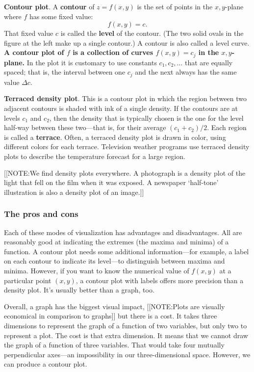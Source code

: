 {\bf Contour plot}. A {\bf contour}
of $z = f(x, y)$ is the set of points in the $x, y$-plane where $f$
has some fixed value:
\[
f(x, y) = c.
\]
That fixed value $c$ is called the {\bf level} of the
contour.  (The two solid ovals in the figure at the left make up a
single contour.)  A contour is also called a level curve.  {\bf A
  contour plot of $f$ is a collection of curves $f(x, y) = c_j$ in the
  $x, y$-plane.}  In the plot it is customary to use constants $c_1,
c_2, \ldots$ that are equally spaced; that is, the interval between
one $c_j$ and the next always has the same value $\Delta c$.


\enlargethispage*{40pt} {\bf Terraced density
  plot}.
This is a contour plot in which the region between two adjacent
contours is shaded with ink of a single density.  If the contours are
at levels $c_1$ and $c_2$, then the density that is typically chosen
is the one for the level half-way between these two---that is, for
their average $(c_1 + c_2)/2$.  Each region is called a {\bf
  terrace}. Often, a terraced density plot is drawn in
color, using different colors for each terrace.  Television weather
programs use terraced density plots to describe the temperature
forecast for a large region.

[[NOTE:We find density plots everywhere.  A photograph is a density
  plot of the light that fell on the film when it was exposed.  A
  newspaper `half-tone' illustration is also a density plot of an
  image.]]

\subsubsection{The pros and cons}
\label{subsubsec:the-pros-and-cons}

Each of these modes of visualization has advantages and disadvantages.
All are reasonably good at indicating the extremes (the maxima and
minima) of a function.  A contour plot needs some additional
information---for example, a label on each contour to indicate its
level---to distinguish between maxima and minima.  However, if you
want to know the numerical value of $f(x, y)$ at a particular point
$(x, y)$, a contour plot with labels offers more precision than a
density plot.  It's usually better than a graph, too.

Overall, a graph has the biggest visual impact, 
[[NOTE:Plots are visually economical in comparison to graphs]]	
but there is a cost.  It takes three dimensions to represent the graph
of a function of two variables, but only two to represent a plot.  The
cost is that extra dimension.  It means that we cannot draw the graph
of a function of three variables.  That would take four mutually
perpendicular axes---an impossibility in our three-dimensional space.
However, we can produce a contour plot.


